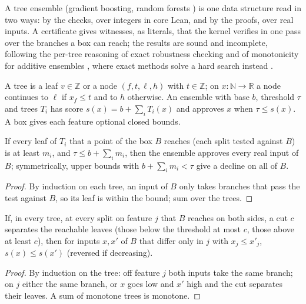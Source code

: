 A tree ensemble (gradient boosting, random forests \cite{ke2017lightgbm,chen2016xgboost}) is one
data structure read in two ways: by the checks, over integers in core Lean, and by the proofs, over
real inputs. A certificate gives witnesses, as literals, that the kernel verifies in one pass over
the branches a box can reach; the results are sound and incomplete, following the per-tree
reasoning of exact robustness checking \cite{chen2019robustness} and of monotonicity for additive
ensembles \cite{devos2021versatile}, where exact methods solve a hard search instead
\cite{kantchelian2016evasion}.

\begin{definition}\label{def:tree_ensemble}
\leanok
A tree is a leaf $v \in \mathbb Z$ or a node $(f, t, \ell, h)$ with $t \in \mathbb Z$; on $x : \mathbb N
\to \mathbb R$ a node continues to $\ell$ if $x_f \le t$ and to $h$ otherwise. An ensemble with base
$b$, threshold $\tau$ and trees $T_i$ has score $s(x) = b + \sum_i T_i(x)$ and approves $x$ when
$\tau \le s(x)$. A box gives each feature optional closed bounds.
\end{definition}

\begin{theorem}\label{thm:tree_robust}
\leanok
{}
If every leaf of $T_i$ that a point of the box $B$ reaches (each split tested against $B$) is at
least $m_i$, and $\tau \le b + \sum_i m_i$, then the ensemble approves every real input of $B$;
symmetrically, upper bounds with $b + \sum_i m_i < \tau$ give a decline on all of $B$.
\end{theorem}
\begin{proof}
\leanok
By induction on each tree, an input of $B$ only takes branches that pass the test against $B$, so
its leaf is within the bound; sum over the trees.
\end{proof}

\begin{theorem}\label{thm:tree_monotone}
\leanok
{}
If, in every tree, at every split on feature $j$ that $B$ reaches on both sides, a cut $c$
separates the reachable leaves (those below the threshold at most $c$, those above at least $c$),
then for inputs $x, x'$ of $B$ that differ only in $j$ with $x_j \le x'_j$, $s(x) \le s(x')$
(reversed if decreasing).
\end{theorem}
\begin{proof}
\leanok
By induction on the tree: off feature $j$ both inputs take the same branch; on $j$ either the same
branch, or $x$ goes low and $x'$ high and the cut separates their leaves. A sum of monotone trees
is monotone.
\end{proof}

